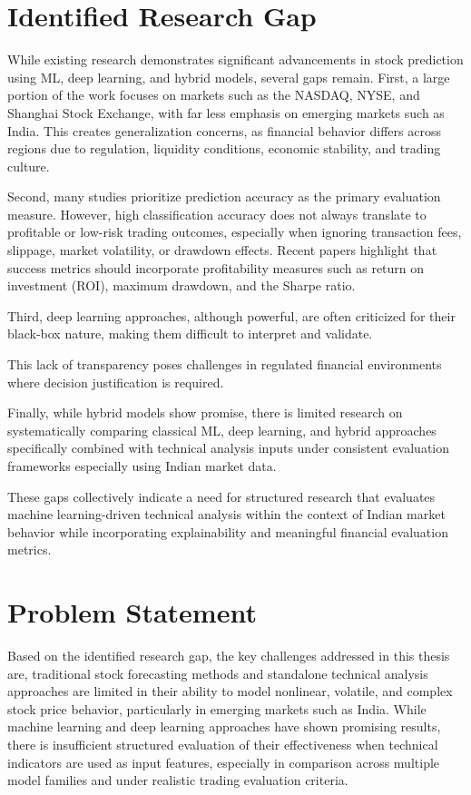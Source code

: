 \section{Identified Research Gap}

While existing research demonstrates significant advancements in stock prediction using ML, deep learning, and hybrid models, several gaps remain. First, a large portion of the work focuses on markets such as the NASDAQ, NYSE, and Shanghai Stock Exchange, with far less emphasis on emerging markets such as India. This creates generalization concerns, as financial behavior differs across regions due to regulation, liquidity conditions, economic stability, and trading culture.

Second, many studies prioritize prediction accuracy as the primary evaluation measure. However, high classification accuracy does not always translate to profitable or low-risk trading outcomes, especially when ignoring transaction fees, slippage, market volatility, or drawdown effects. Recent papers highlight that success metrics should incorporate profitability measures such as return on investment (ROI), maximum drawdown, and the Sharpe ratio.

Third, deep learning approaches, although powerful, are often criticized for their black-box nature, making them difficult to interpret and validate. 

This lack of transparency poses challenges in regulated financial environments where decision justification is required.

Finally, while hybrid models show promise, there is limited research on systematically comparing classical ML, deep learning, and hybrid approaches specifically combined with technical analysis inputs under consistent evaluation frameworks  especially using Indian market data.

These gaps collectively indicate a need for structured research that evaluates machine learning-driven technical analysis within the context of Indian market behavior while incorporating explainability and meaningful financial evaluation metrics.

\section{Problem Statement}

Based on the identified research gap, the key challenges addressed in this thesis are, traditional stock forecasting methods and standalone technical analysis approaches are limited in their ability to model nonlinear, volatile, and complex stock price behavior, particularly in emerging markets such as India. While machine learning and deep learning approaches have shown promising results, there is insufficient structured evaluation of their effectiveness when technical indicators are used as input features, especially in comparison across multiple model families and under realistic trading evaluation criteria.

